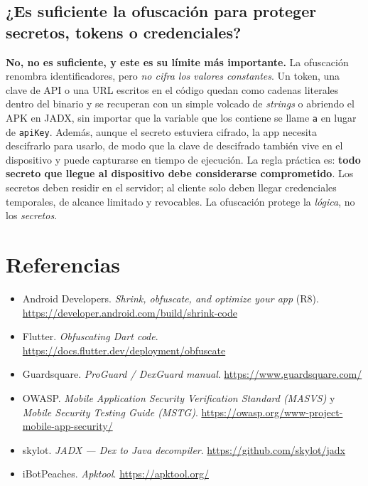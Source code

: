 \documentclass[12pt,letterpaper]{article}
\begin{document}
\subsection*{¿Es suficiente la ofuscación para proteger secretos, tokens o credenciales?}
\textbf{No, no es suficiente, y este es su límite más importante.} La ofuscación
renombra identificadores, pero \emph{no cifra los valores constantes}. Un token,
una clave de API o una URL escritos en el código quedan como cadenas literales
dentro del binario y se recuperan con un simple volcado de \emph{strings} o
abriendo el APK en JADX, sin importar que la variable que los contiene se llame
\texttt{a} en lugar de \texttt{apiKey}. Además, aunque el secreto estuviera
cifrado, la app necesita descifrarlo para usarlo, de modo que la clave de
descifrado también vive en el dispositivo y puede capturarse en tiempo de
ejecución. La regla práctica es: \textbf{todo secreto que llegue al dispositivo
debe considerarse comprometido}. Los secretos deben residir en el servidor; al
cliente solo deben llegar credenciales temporales, de alcance limitado y
revocables. La ofuscación protege la \emph{lógica}, no los \emph{secretos}.

\section*{Referencias}
\begin{itemize}[leftmargin=1.4em]
  \item Android Developers. \textit{Shrink, obfuscate, and optimize your app}
        (R8). \url{https://developer.android.com/build/shrink-code}
  \item Flutter. \textit{Obfuscating Dart code}.
        \url{https://docs.flutter.dev/deployment/obfuscate}
  \item Guardsquare. \textit{ProGuard / DexGuard manual}.
        \url{https://www.guardsquare.com/}
  \item OWASP. \textit{Mobile Application Security Verification Standard
        (MASVS)} y \textit{Mobile Security Testing Guide (MSTG)}.
        \url{https://owasp.org/www-project-mobile-app-security/}
  \item skylot. \textit{JADX — Dex to Java decompiler}.
        \url{https://github.com/skylot/jadx}
  \item iBotPeaches. \textit{Apktool}.
        \url{https://apktool.org/}
\end{itemize}
\end{document}
